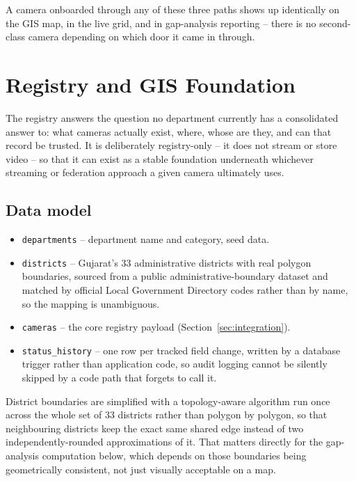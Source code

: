 \documentclass[11pt,a4paper]{article}
\begin{document}
A camera onboarded through any of these three paths shows up identically on
the GIS map, in the live grid, and in gap-analysis reporting -- there is no
second-class camera depending on which door it came in through.

\section{Registry and GIS Foundation}
\label{sec:model1}

The registry answers the question no department currently has a
consolidated answer to: what cameras actually exist, where, whose are they,
and can that record be trusted. It is deliberately registry-only -- it does
not stream or store video -- so that it can exist as a stable foundation
underneath whichever streaming or federation approach a given camera
ultimately uses.

\subsection{Data model}

\begin{itemize}
\item \texttt{departments} -- department name and category, seed data.
\item \texttt{districts} -- Gujarat's 33 administrative districts with real
  polygon boundaries, sourced from a public administrative-boundary
  dataset and matched by official Local Government Directory codes rather
  than by name, so the mapping is unambiguous.
\item \texttt{cameras} -- the core registry payload (Section~\ref{sec:integration}).
\item \texttt{status\_history} -- one row per tracked field change, written
  by a database trigger rather than application code, so audit logging
  cannot be silently skipped by a code path that forgets to call it.
\end{itemize}

District boundaries are simplified with a topology-aware algorithm run once
across the whole set of 33 districts rather than polygon by polygon, so
that neighbouring districts keep the exact same shared edge instead of two
independently-rounded approximations of it. That matters directly for the
gap-analysis computation below, which depends on those boundaries being
geometrically consistent, not just visually acceptable on a map.
\end{document}
